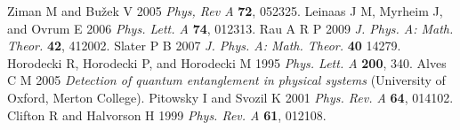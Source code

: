 \documentclass[12pt]{iopart}
\begin{document}
\begin{thebibliography}{99}
 Ziman M and Bu\v{z}ek V 2005 {\it Phys, Rev A} {\bf 72}, 052325.
 Leinaas J M, Myrheim J, and Ovrum E 2006 {\it Phys. Lett. A} {\bf 74}, 012313.
 Rau A R P 2009 {\it J. Phys. A: Math. Theor.} {\bf 42}, 412002.
 Slater P B 2007 {\it J. Phys. A: Math. Theor.} {\bf 40} 14279.
 Horodecki R, Horodecki P, and Horodecki M 1995 {\it Phys. Lett. A} {\bf 200}, 340.
 Alves C M 2005 {\it Detection of quantum entanglement in physical systems} (University of Oxford, Merton College).
 Pitowsky I and Svozil K 2001 {\it Phys. Rev. A} {\bf 64}, 014102.
 Clifton R and Halvorson H 1999 {\it Phys. Rev. A} {\bf 61}, 012108.


\end{thebibliography}
\end{document}
